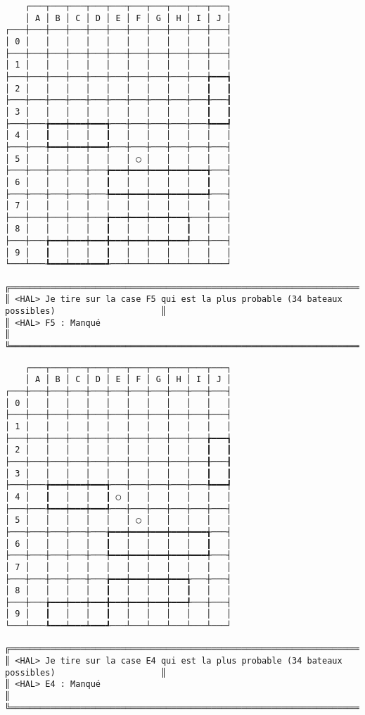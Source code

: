{\scriptsize
\begin{verbatim}
    ┌───┬───┬───┬───┬───┬───┬───┬───┬───┬───┐
    │ A │ B │ C │ D │ E │ F │ G │ H │ I │ J │
┌───┼───┼───┼───┼───┼───┼───┼───┼───┼───┼───┤
│ 0 │   │   │   │   │   │   │   │   │   │   │
├───┼───┼───┼───┼───┼───┼───┼───┼───┼───┼───┤
│ 1 │   │   │   │   │   │   │   │   │   │   │
├───┼───┼───┼───┼───┼───┼───┼───┼───┼───╆━━━┪
│ 2 │   │   │   │   │   │   │   │   │   ┃   ┃
├───┼───┼───┼───┼───┼───┼───┼───┼───┼───╂───┨
│ 3 │   │   │   │   │   │   │   │   │   ┃   ┃
├───┼───╆━━━┿━━━┿━━━╅───┼───┼───┼───┼───╄━━━┩
│ 4 │   ┃   │   │   ┃   │   │   │   │   │   │
├───┼───╄━━━┿━━━┿━━━╃───┼───┼───┼───┼───┼───┤
│ 5 │   │   │   │   │   │ ◯ │   │   │   │   │
├───┼───┼───┼───┼───╆━━━┿━━━┿━━━┿━━━┿━━━╅───┤
│ 6 │   │   │   │   ┃   │   │   │   │   ┃   │
├───┼───┼───┼───┼───╄━━━┿━━━┿━━━┿━━━┿━━━╃───┤
│ 7 │   │   │   │   │   │   │   │   │   │   │
├───┼───┼───┼───┼───╆━━━┿━━━┿━━━┿━━━╅───┼───┤
│ 8 │   │   │   │   ┃   │   │   │   ┃   │   │
├───┼───╆━━━┿━━━┿━━━╋━━━┿━━━┿━━━┿━━━╃───┼───┤
│ 9 │   ┃   │   │   ┃   │   │   │   │   │   │
└───┴───┺━━━┷━━━┷━━━┹───┴───┴───┴───┴───┴───┘

╔══════════════════════════════════════════════════════════════════════════════════════════════════╗
║ <HAL> Je tire sur la case F5 qui est la plus probable (34 bateaux possibles)                     ║
║ <HAL> F5 : Manqué                                                                                ║
╚══════════════════════════════════════════════════════════════════════════════════════════════════╝
\end{verbatim}}
\newpage

{\scriptsize
\begin{verbatim}
    ┌───┬───┬───┬───┬───┬───┬───┬───┬───┬───┐
    │ A │ B │ C │ D │ E │ F │ G │ H │ I │ J │
┌───┼───┼───┼───┼───┼───┼───┼───┼───┼───┼───┤
│ 0 │   │   │   │   │   │   │   │   │   │   │
├───┼───┼───┼───┼───┼───┼───┼───┼───┼───┼───┤
│ 1 │   │   │   │   │   │   │   │   │   │   │
├───┼───┼───┼───┼───┼───┼───┼───┼───┼───╆━━━┪
│ 2 │   │   │   │   │   │   │   │   │   ┃   ┃
├───┼───┼───┼───┼───┼───┼───┼───┼───┼───╂───┨
│ 3 │   │   │   │   │   │   │   │   │   ┃   ┃
├───┼───╆━━━┿━━━┿━━━╅───┼───┼───┼───┼───╄━━━┩
│ 4 │   ┃   │   │   ┃ ◯ │   │   │   │   │   │
├───┼───╄━━━┿━━━┿━━━╃───┼───┼───┼───┼───┼───┤
│ 5 │   │   │   │   │   │ ◯ │   │   │   │   │
├───┼───┼───┼───┼───╆━━━┿━━━┿━━━┿━━━┿━━━╅───┤
│ 6 │   │   │   │   ┃   │   │   │   │   ┃   │
├───┼───┼───┼───┼───╄━━━┿━━━┿━━━┿━━━┿━━━╃───┤
│ 7 │   │   │   │   │   │   │   │   │   │   │
├───┼───┼───┼───┼───╆━━━┿━━━┿━━━┿━━━╅───┼───┤
│ 8 │   │   │   │   ┃   │   │   │   ┃   │   │
├───┼───╆━━━┿━━━┿━━━╋━━━┿━━━┿━━━┿━━━╃───┼───┤
│ 9 │   ┃   │   │   ┃   │   │   │   │   │   │
└───┴───┺━━━┷━━━┷━━━┹───┴───┴───┴───┴───┴───┘

╔══════════════════════════════════════════════════════════════════════════════════════════════════╗
║ <HAL> Je tire sur la case E4 qui est la plus probable (34 bateaux possibles)                     ║
║ <HAL> E4 : Manqué                                                                                ║
╚══════════════════════════════════════════════════════════════════════════════════════════════════╝
\end{verbatim}}
\newpage

